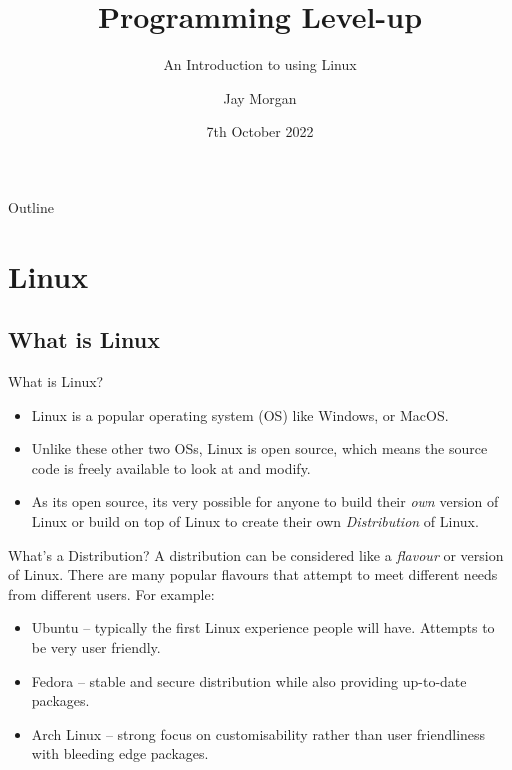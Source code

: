 \documentclass[10pt]{beamer}
\author{Jay Morgan}
\date{7th October 2022}
\title{Programming Level-up}
\subtitle{An Introduction to using Linux}
\begin{document}
\maketitle
\begin{frame}{Outline}
\tableofcontents
\end{frame}


\section{Linux}
\label{sec:org6c3a21e}

\subsection{What is Linux}
\label{sec:org1a3e6df}

\begin{frame}[label={sec:org1b9bb0f}]{What is Linux?}
\begin{itemize}
\item Linux is a popular operating system (OS) like Windows, or MacOS.
\item Unlike these other two OSs, Linux is open source, which means the source code
is freely available to look at and modify.
\item As its open source, its very possible for anyone to build their \emph{own} version of
Linux or build on top of Linux to create their own \emph{Distribution} of Linux.
\end{itemize}
\end{frame}

\begin{frame}[label={sec:orgff622b9}]{What's a Distribution?}
A distribution can be considered like a \emph{flavour} or version of Linux. There are
many popular flavours that attempt to meet different needs from different
users. For example:

\begin{itemize}
\item Ubuntu -- typically the first Linux experience people will have. Attempts to be
very user friendly.
\item Fedora -- stable and secure distribution while also providing up-to-date packages.
\item Arch Linux -- strong focus on customisability rather than user friendliness
with bleeding edge packages.
\end{itemize}
\end{frame}
\end{document}
